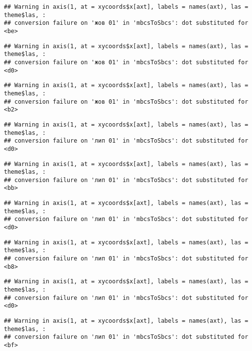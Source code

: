 \documentclass[]{article}
\begin{document}
\begin{verbatim}
## Warning in axis(1, at = xycoords$x[axt], labels = names(axt), las = theme$las, :
## conversion failure on 'жов 01' in 'mbcsToSbcs': dot substituted for <be>
\end{verbatim}

\begin{verbatim}
## Warning in axis(1, at = xycoords$x[axt], labels = names(axt), las = theme$las, :
## conversion failure on 'жов 01' in 'mbcsToSbcs': dot substituted for <d0>
\end{verbatim}

\begin{verbatim}
## Warning in axis(1, at = xycoords$x[axt], labels = names(axt), las = theme$las, :
## conversion failure on 'жов 01' in 'mbcsToSbcs': dot substituted for <b2>
\end{verbatim}

\begin{verbatim}
## Warning in axis(1, at = xycoords$x[axt], labels = names(axt), las = theme$las, :
## conversion failure on 'лип 01' in 'mbcsToSbcs': dot substituted for <d0>
\end{verbatim}

\begin{verbatim}
## Warning in axis(1, at = xycoords$x[axt], labels = names(axt), las = theme$las, :
## conversion failure on 'лип 01' in 'mbcsToSbcs': dot substituted for <bb>
\end{verbatim}

\begin{verbatim}
## Warning in axis(1, at = xycoords$x[axt], labels = names(axt), las = theme$las, :
## conversion failure on 'лип 01' in 'mbcsToSbcs': dot substituted for <d0>
\end{verbatim}

\begin{verbatim}
## Warning in axis(1, at = xycoords$x[axt], labels = names(axt), las = theme$las, :
## conversion failure on 'лип 01' in 'mbcsToSbcs': dot substituted for <b8>
\end{verbatim}

\begin{verbatim}
## Warning in axis(1, at = xycoords$x[axt], labels = names(axt), las = theme$las, :
## conversion failure on 'лип 01' in 'mbcsToSbcs': dot substituted for <d0>
\end{verbatim}

\begin{verbatim}
## Warning in axis(1, at = xycoords$x[axt], labels = names(axt), las = theme$las, :
## conversion failure on 'лип 01' in 'mbcsToSbcs': dot substituted for <bf>
\end{verbatim}
\end{document}
